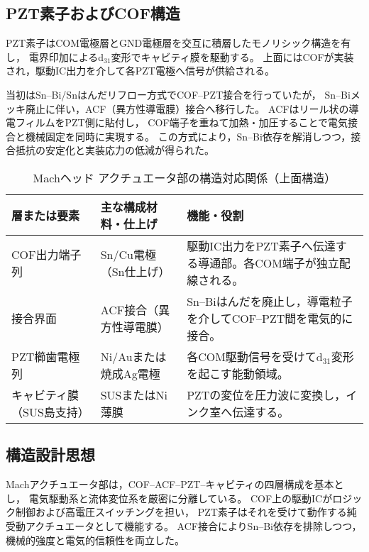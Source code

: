 \documentclass[conference]{IEEEtran}
\begin{document}
\subsection{PZT素子およびCOF構造}

PZT素子はCOM電極層とGND電極層を交互に積層したモノリシック構造を有し，
電界印加によるd$_{31}$変形でキャビティ膜を駆動する。  
上面にはCOFが実装され，駆動IC出力を介して各PZT電極へ信号が供給される。  

当初はSn–Bi/Snはんだリフロー方式でCOF–PZT接合を行っていたが，
Sn–Biメッキ廃止に伴い，ACF（異方性導電膜）接合へ移行した。  
ACFはリール状の導電フィルムをPZT側に貼付し，
COF端子を重ねて加熱・加圧することで電気接合と機械固定を同時に実現する。  
この方式により，Sn–Bi依存を解消しつつ，接合抵抗の安定化と実装応力の低減が得られた。

\begin{table}[t]
\centering
\caption{Machヘッド アクチュエータ部の構造対応関係（上面構造）}
\footnotesize
\renewcommand{\arraystretch}{1.05}
\setlength{\tabcolsep}{3pt}
\begin{tabularx}{\columnwidth}{l l X}
\toprule
層または要素 & 主な構成材料・仕上げ & 機能・役割 \\
\midrule
COF出力端子列 & Sn/Cu電極（Sn仕上げ） & 駆動IC出力をPZT素子へ伝達する導通部。各COM端子が独立配線される。 \\
接合界面 & ACF接合（異方性導電膜） & Sn–Biはんだを廃止し，導電粒子を介してCOF–PZT間を電気的に接合。 \\
PZT櫛歯電極列 & Ni/Auまたは焼成Ag電極 & 各COM駆動信号を受けてd$_{31}$変形を起こす能動領域。 \\
キャビティ膜（SUS島支持） & SUSまたはNi薄膜 & PZTの変位を圧力波に変換し，インク室へ伝達する。 \\
\bottomrule
\end{tabularx}
\label{tab:mach_actuator_layers}
\end{table}

\subsection{構造設計思想}

Machアクチュエータ部は，COF–ACF–PZT–キャビティの四層構成を基本とし，
電気駆動系と流体変位系を厳密に分離している。  
COF上の駆動ICがロジック制御および高電圧スイッチングを担い，
PZT素子はそれを受けて動作する純受動アクチュエータとして機能する。  
ACF接合によりSn–Bi依存を排除しつつ，機械的強度と電気的信頼性を両立した。
\end{document}
